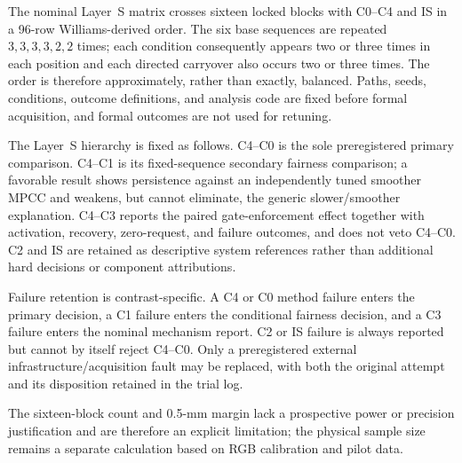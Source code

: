 The nominal Layer~S matrix crosses sixteen locked blocks with C0--C4 and IS in
a 96-row Williams-derived order.  The six base sequences are repeated
$3,3,3,3,2,2$ times; each condition consequently appears two or three times in
each position and each directed carryover also occurs two or three times.  The
order is therefore approximately, rather than exactly, balanced. Paths, seeds,
conditions, outcome definitions, and analysis code are fixed before formal
acquisition, and formal outcomes are not used for retuning.

The Layer~S hierarchy is fixed as follows. C4--C0 is the sole preregistered
primary comparison. C4--C1 is its fixed-sequence secondary fairness comparison;
a favorable result shows persistence against an independently tuned smoother
MPCC and weakens, but cannot eliminate, the generic slower/smoother explanation.
C4--C3 reports the paired gate-enforcement effect together with activation,
recovery, zero-request, and failure outcomes, and does not veto C4--C0. C2 and
IS are retained as descriptive system references rather than additional hard
decisions or component attributions.

Failure retention is contrast-specific.  A C4 or C0 method failure enters the
primary decision, a C1 failure enters the conditional fairness decision, and a
C3 failure enters the nominal mechanism report.  C2 or IS failure is always
reported but cannot by itself reject C4--C0.  Only a preregistered external
infrastructure/acquisition fault may be replaced, with both the original
attempt and its disposition retained in the trial log.

The sixteen-block count and 0.5-mm margin lack a prospective power or precision
justification and are therefore an explicit limitation; the physical sample
size remains a separate calculation based on RGB calibration and pilot data.

